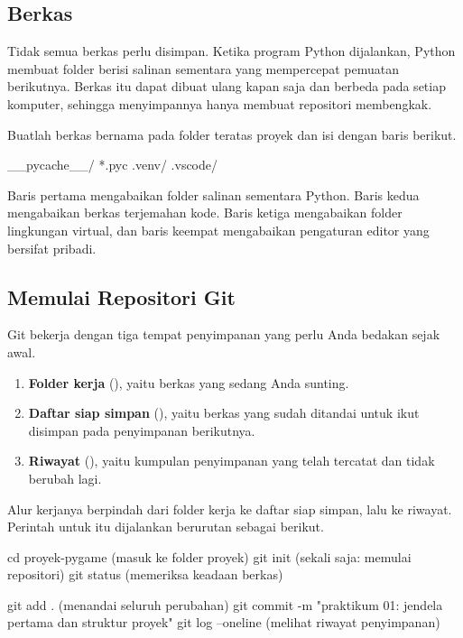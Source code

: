 \subsection{Berkas }

Tidak semua berkas perlu disimpan. Ketika program Python dijalankan, Python
membuat folder  berisi salinan sementara yang mempercepat
pemuatan berikutnya. Berkas itu dapat dibuat ulang kapan saja dan berbeda pada
setiap komputer, sehingga menyimpannya hanya membuat repositori membengkak.

Buatlah berkas bernama  pada folder teratas proyek dan isi
dengan baris berikut.

\begin{kodekeluaran}
__pycache__/
*.pyc
.venv/
.vscode/
\end{kodekeluaran}

Baris pertama mengabaikan folder salinan sementara Python. Baris kedua
mengabaikan berkas terjemahan kode. Baris ketiga mengabaikan folder lingkungan
virtual, dan baris keempat mengabaikan pengaturan editor yang bersifat
pribadi.

\subsection{Memulai Repositori Git}

Git bekerja dengan tiga tempat penyimpanan yang perlu Anda bedakan sejak awal.

\begin{enumerate}
  \item \textbf{Folder kerja} (), yaitu berkas yang
        sedang Anda sunting.
  \item \textbf{Daftar siap simpan} (), yaitu berkas
        yang sudah ditandai untuk ikut disimpan pada penyimpanan berikutnya.
  \item \textbf{Riwayat} (), yaitu kumpulan penyimpanan
        yang telah tercatat dan tidak berubah lagi.
\end{enumerate}

Alur kerjanya berpindah dari folder kerja ke daftar siap simpan, lalu ke
riwayat. Perintah untuk itu dijalankan berurutan sebagai berikut.

\begin{kodekeluaran}
cd proyek-pygame          (masuk ke folder proyek)
git init                  (sekali saja: memulai repositori)
git status                (memeriksa keadaan berkas)

git add .                 (menandai seluruh perubahan)
git commit -m "praktikum 01: jendela pertama dan struktur proyek"
git log --oneline         (melihat riwayat penyimpanan)
\end{kodekeluaran}

